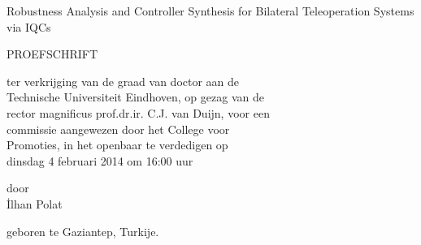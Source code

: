 \newcommand{\ilhant}{Robustness Analysis and Controller Synthesis for Bilateral Teleoperation Systems via IQCs}
\newcommand{\ilhans}{}  
\newcommand*{\ilhana}{İlhan Polat}
    \thispagestyle{empty}
    \vspace*{20mm}
    
    \begin{center}
        \huge\ilhant
    \end{center}
    
    \vspace{10mm}
    
    \begin{center}PROEFSCHRIFT\end{center}
    
    \vspace{10mm}
    
    
    \begin{center}
    ter verkrijging van de graad van doctor aan de\\
    Technische Universiteit Eindhoven, op gezag van de\\
    rector magnificus prof.dr.ir. C.J. van Duijn, voor een\\
    commissie aangewezen door het College voor\\
    Promoties, in het openbaar te verdedigen op\\
    dinsdag 4 februari 2014 om 16:00 uur
    \vspace{15mm}
    
    door\\
    \vspace{15mm}
    \ilhana
    
    \vspace{15mm}
    
    geboren te Gaziantep, Turkije.
    \end{center}
    
